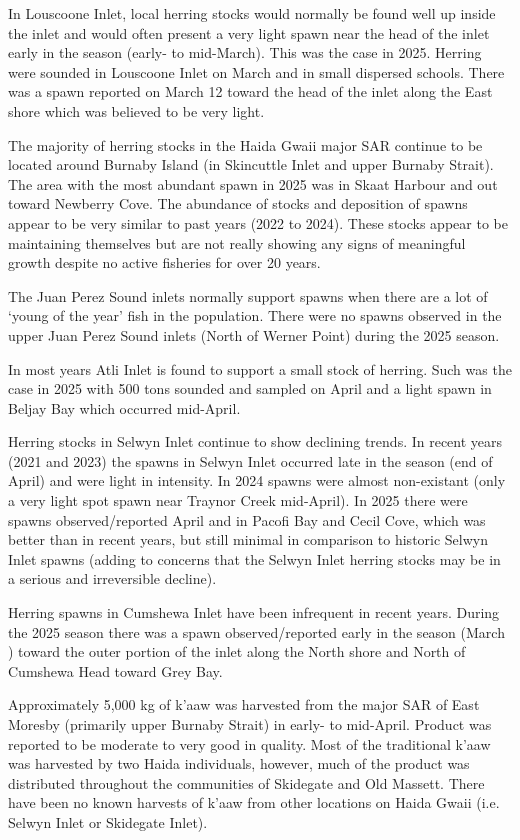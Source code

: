 In Louscoone Inlet,
local herring stocks would normally be found well up inside the inlet and
would often present a very light spawn near the head of the inlet early
in the season (early- to mid-March).
This was the case in 2025.
Herring were sounded in Louscoone Inlet on March  and  in small dispersed schools.
There was a spawn reported on March 12 toward the head of the inlet
along the East shore which was believed to be very light.

The majority of herring stocks in the Haida Gwaii major SAR
continue to be located around Burnaby Island (in Skincuttle Inlet and upper Burnaby Strait).
The area with the most abundant spawn in 2025 was in Skaat Harbour and out toward Newberry Cove.
The abundance of stocks and deposition of spawns appear to be very similar to past years (2022 to 2024).
These stocks appear to be maintaining themselves but are not really showing any signs
of meaningful growth despite no active fisheries for over 20 years.

The Juan Perez Sound inlets normally support spawns when
there are a lot of `young of the year' fish in the population.
There were no spawns observed in the upper Juan Perez Sound inlets (North of Werner Point)
during the 2025 season.

In most years Atli Inlet is found to support a small stock of herring.
Such was the case in 2025 with 500 tons sounded and sampled on April  and
a light spawn in Beljay Bay which occurred mid-April. 

Herring stocks in Selwyn Inlet continue to show declining trends.
In recent years (2021 and 2023) the spawns in Selwyn Inlet occurred
late in the season (end of April) and were light in intensity.
In 2024 spawns were almost non-existant
(only a very light spot spawn near Traynor Creek mid-April).
In 2025 there were spawns observed/reported April  and 
in Pacofi Bay and Cecil Cove, which was better than in recent years,
but still minimal in comparison to historic Selwyn Inlet spawns
(adding to concerns that the Selwyn Inlet herring stocks
may be in a serious and irreversible decline).

Herring spawns in Cumshewa Inlet have been infrequent in recent years.
During the 2025 season there was a spawn observed/reported early in the season (March )
toward the outer portion of the inlet along the North shore and
North of Cumshewa Head toward Grey Bay.

Approximately 5,000 kg of k'aaw was harvested from the major SAR
of East Moresby (primarily upper Burnaby Strait) in early- to mid-April.
Product was reported to be moderate to very good in quality.
Most of the traditional k'aaw was harvested by two Haida individuals, however,
much of the product was distributed throughout the communities of Skidegate and Old Massett.
There have been no known harvests of k'aaw from other locations on Haida Gwaii
(i.e. Selwyn Inlet or Skidegate Inlet).

